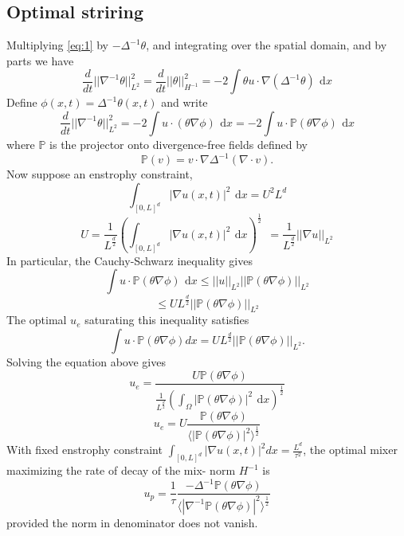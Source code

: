 \documentclass[12pt]{report}   %
\renewcommand{\leq}{\leqslant}
\numberwithin{equation}{section}
\theoremstyle{plain}
\theoremstyle{definition}
\theoremstyle{remark}
\newcommand{\rmd}{\, \mathrm{d}}
\begin{document}
\subsection{Optimal striring}
	Multiplying \eqref{eq:1}  by $-\Delta^{-1}\theta$, and integrating over the spatial domain, and by parts we have
   	\begin{equation}
   	\frac{d}{dt}||\nabla^{-1}\theta||_{L^2}^2 = \frac{d}{dt}||\theta||_{H^{-1}}^2 = -2\int\theta u\cdot\nabla(\Delta^{-1}\theta) ~\rmd x
   	\end{equation}
   Define $\phi(x,t) = \Delta^{-1}\theta(x,t)$  and  write \\
   \begin{equation}
	\frac{d}{dt}||\nabla^{-1}\theta||_{L^2}^2 = -2\int u\cdot(\theta\nabla\phi) ~\rmd x = -2\int u\cdot \mathbb{P}(\theta\nabla\phi) ~\rmd x
   \end{equation}
   where $\mathbb{P}$ is the projector onto divergence-free fields defined by 
  \[ \mathbb{P}(v) = v\cdot\nabla\Delta^{-1}(\nabla\cdot v) .\]
  Now suppose an enstrophy constraint,
  \[\int_{[0,L]^d}|\nabla u(x,t)|^2 ~\rmd x = U^2L^d\]
  \[U = \frac{1}{L^\frac{d}{2}}\left(\int_{[0,L]^d}|\nabla u(x,t)|^2 ~\rmd x\right)^\frac{1}{2}~~ = \frac{1}{L^\frac{d}{2}} ||\nabla u||_{L^2}\]
  In particular, the Cauchy-Schwarz inequality gives
\[\int u\cdot \mathbb{P}(\theta\nabla\phi) ~\rmd x \leq ||u||_{L^2}||\mathbb{P}(\theta\nabla\phi)||_{L^2}\]
\[ \leq UL^\frac{d}{2}||\mathbb{P}(\theta\nabla\phi)||_{L^2}\]
The optimal $u_e$ saturating this inequality satisfies
\[ \int u\cdot \mathbb{P}(\theta\nabla\phi) dx = UL^\frac{d}{2}||\mathbb{P}(\theta\nabla\phi)||_{L^2} .\]
Solving the equation above gives 
\[u_e = \frac{U\mathbb{P}(\theta\nabla\phi)}{\frac{1}{L^\frac{d}{2}}
\left( \int_{\Omega} |\mathbb{P}(\theta\nabla\phi)|^2 ~\rmd x \right)^\frac{1}{2} 
} \]
\begin{equation}
u_e = U\frac{\mathbb{P}(\theta\nabla\phi)}{\langle|\mathbb{P}(\theta\nabla\phi)|^2\rangle^\frac{1}{2} }
\end{equation}
 With fixed enstrophy constraint $ \int_{[0,L]^d}|\nabla u(x,t)|^2 dx = \frac{L^d}{\tau^2}$, the optimal mixer maximizing the rate of decay of the mix- norm $H^{-1}$ is \\
  \begin{equation}\label{ensoptvec}
  u_p = \frac{1}{\tau} \frac{-\Delta^{-1}\mathbb{P}(\theta\nabla\phi)}{\langle|\nabla^{-1}\mathbb{P}(\theta\nabla\phi)|^2\rangle^{\frac{1}{2}}}
  \end{equation}
  provided the norm in denominator does not vanish.
\end{document}
